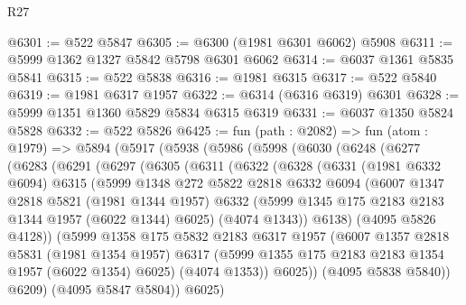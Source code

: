 \begin{lexlean}{R27}
\begin{coremodule}
@6301 := @522 @5847
@6305 := @6300 (@1981 @6301 @6062) @5908
@6311 := @5999 @1362 @1327 @5842 @5798 @6301 @6062
@6314 := @6037 @1361 @5835 @5841
@6315 := @522 @5838
@6316 := @1981 @6315
@6317 := @522 @5840
@6319 := @1981 @6317 @1957
@6322 := @6314 (@6316 @6319) @6301
@6328 := @5999 @1351 @1360 @5829 @5834 @6315 @6319
@6331 := @6037 @1350 @5824 @5828
@6332 := @522 @5826
@6425 := fun (path : @2082) =>
  fun (atom : @1979) =>
  @5894
    (@5917
      (@5938
        (@5986
          (@5998
            (@6030
              (@6248
                (@6277
                  (@6283
                    (@6291
                      (@6297
                        (@6305
                          (@6311
                            (@6322
                              (@6328
                                (@6331
                                  (@1981 @6332 @6094)
                                  @6315
                                  (@5999
                                    @1348
                                    @272
                                    @5822
                                    @2818
                                    @6332
                                    @6094
                                    (@6007
                                      @1347
                                      @2818
                                      @5821
                                      (@1981 @1344 @1957)
                                      @6332
                                      (@5999 @1345 @175 @2183 @2183 @1344 @1957 (@6022 @1344) @6025)
                                      (@4074 @1343))
                                    @6138)
                                  (@4095 @5826 @4128))
                                (@5999
                                  @1358
                                  @175
                                  @5832
                                  @2183
                                  @6317
                                  @1957
                                  (@6007
                                    @1357
                                    @2818
                                    @5831
                                    (@1981 @1354 @1957)
                                    @6317
                                    (@5999 @1355 @175 @2183 @2183 @1354 @1957 (@6022 @1354) @6025)
                                    (@4074 @1353))
                                  @6025))
                              (@4095 @5838 @5840))
                            @6209)
                          (@4095 @5847 @5804))
                        @6025)

\end{coremodule}
\end{lexlean}
